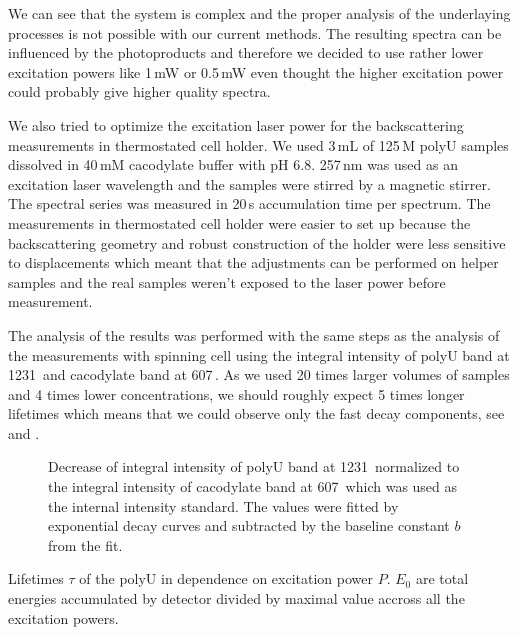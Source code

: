 We can see that the system is complex and the proper analysis of the
underlaying processes is not possible with our current methods. The resulting
spectra can be influenced by the photoproducts and therefore we decided to use
rather lower excitation powers like 1\,mW or 0.5\,mW even thought the higher
excitation power could probably give higher quality spectra.

We also tried to optimize the excitation laser power for the backscattering
measurements in thermostated cell holder. We used 3\,mL of 125\,M polyU
samples dissolved in 40\,mM cacodylate buffer with pH 6.8. 257\,nm was used as
an excitation laser wavelength and the samples were stirred by a magnetic
stirrer. The spectral series was measured in 20\,s accumulation time per
spectrum. The measurements in thermostated cell holder were easier to set up
because the backscattering geometry and robust construction of the holder
were less sensitive to displacements which meant that the adjustments can be
performed on helper samples and the real samples weren't exposed to the
laser power before measurement.

The analysis of the results was performed with the same steps as the analysis
of the measurements with spinning cell using the integral intensity of polyU
band at 1231\,\icm{} and cacodylate band at 607\,\icm{}. As we used 20 times
larger volumes of samples and 4 times lower concentrations, we should roughly
expect 5 times longer lifetimes which means that we could observe only the fast
decay components, see
and
.

\begin{figure}
	\centering
	
	\caption{Decrease of integral intensity of polyU band at 1231\,\icm{}
		normalized to the integral intensity of cacodylate band at 607\,\icm{}
		which was used as the internal intensity standard. The values were fitted
		by exponential decay curves  and subtracted
		by the baseline constant $b$ from the fit.}
	\label{\figlabel{power_optim:hairpins}}
\end{figure}

\begin{table}
	\centering
	
	\caption{Lifetimes $\tau$ of the polyU in dependence on excitation power
		$P$. $E_0$ are total energies accumulated by detector divided by maximal
		value accross all the excitation powers.
	}
	\label{\tablabel{power_optim:lifetimes_hairpins}}
\end{table}

